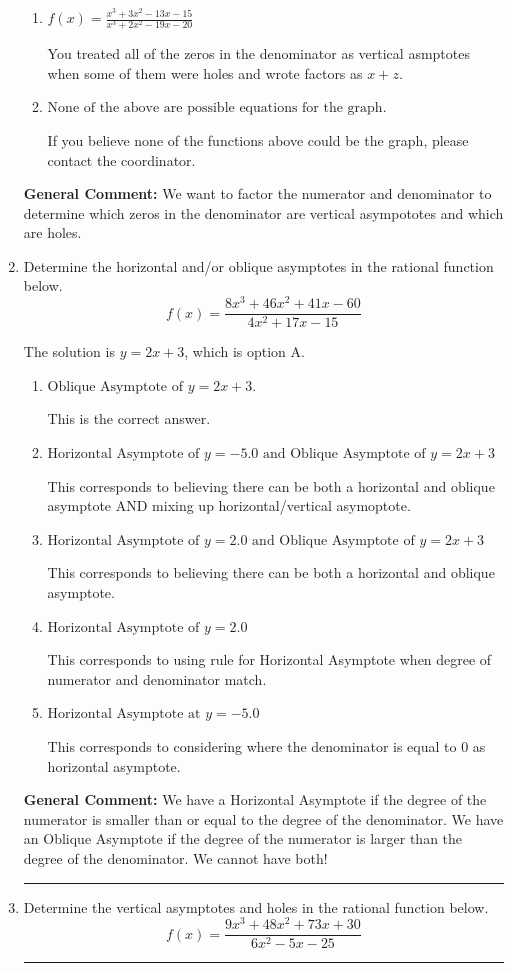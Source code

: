 \documentclass{extbook}[14pt]
\newcommand{\litem}[1]{\item #1

\rule{\textwidth}{0.4pt}}
\begin{document}
\begin{enumerate}
{\begin{enumerate}[label=\Alph*.]
This is the correct answer!
\item \( f(x)=\frac{x^{3} +3 x^{2} -13 x -15}{x^{3} +2 x^{2} -19 x -20} \)

You treated all of the zeros in the denominator as vertical asmptotes when some of them were holes and wrote factors as $x+z$.
\item \( \text{None of the above are possible equations for the graph.} \)

If you believe none of the functions above could be the graph, please contact the coordinator.
\end{enumerate}

\textbf{General Comment:} We want to factor the numerator and denominator to determine which zeros in the denominator are vertical asympototes and which are holes.
}
\litem{
Determine the horizontal and/or oblique asymptotes in the rational function below.
\[ f(x) = \frac{8x^{3} +46 x^{2} +41 x -60}{4x^{2} +17 x -15} \]

The solution is \( y = 2x + 3 \), which is option A.\begin{enumerate}[label=\Alph*.]
\item \( \text{Oblique Asymptote of } y = 2x + 3. \)

This is the correct answer.
\item \( \text{Horizontal Asymptote of } y = -5.0 \text{ and Oblique Asymptote of } y = 2x + 3 \)

This corresponds to believing there can be both a horizontal and oblique asymptote AND mixing up horizontal/vertical asymoptote.
\item \( \text{Horizontal Asymptote of } y = 2.0 \text{ and Oblique Asymptote of } y = 2x + 3 \)

This corresponds to believing there can be both a horizontal and oblique asymptote.
\item \( \text{Horizontal Asymptote of } y = 2.0  \)

This corresponds to using rule for Horizontal Asymptote when degree of numerator and denominator match.
\item \( \text{Horizontal Asymptote at } y = -5.0 \)

This corresponds to considering where the denominator is equal to 0 as horizontal asymptote.
\end{enumerate}

\textbf{General Comment:} We have a Horizontal Asymptote if the degree of the numerator is smaller than or equal to the degree of the denominator. We have an Oblique Asymptote if the degree of the numerator is larger than the degree of the denominator. We cannot have both!
}
\litem{
Determine the vertical asymptotes and holes in the rational function below.
\[ f(x) = \frac{9x^{3} +48 x^{2} +73 x + 30}{6x^{2} -5 x -25} \]

}
\end{enumerate}
\end{document}
